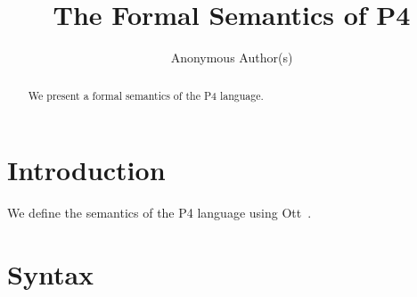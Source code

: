 \documentclass{article}
\title{The Formal Semantics of P4}
\author{Anonymous Author(s)}
\date{}
\begin{document}
\maketitle

\begin{abstract}
We present a formal semantics of the P4 language.
\end{abstract}

\section{Introduction}

We define the semantics of the P4 language using Ott~\cite{Sewell2010}.

\section{Syntax}

\ottgrammar{}



\end{document}
